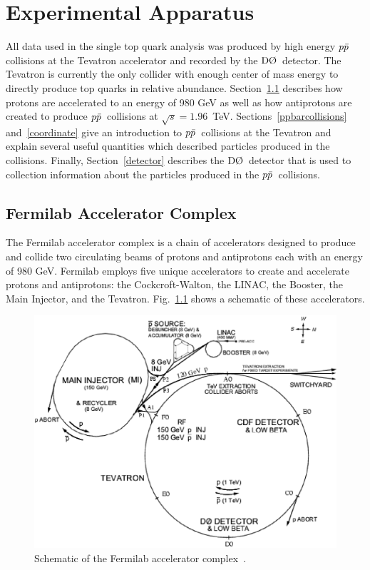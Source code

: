 \chapter{Experimental Apparatus}
\label{experiment}

All data used in the single top quark analysis was produced by high energy $\mbox{$p\bar{p}$}$ collisions at the Tevatron accelerator and recorded by the $\dzero$~detector. The Tevatron is currently the only collider with enough center of mass energy to directly produce top quarks in relative abundance. Section~\ref{tevatron} describes how protons are accelerated to an energy of 980 GeV as well as how antiprotons are created to produce $\mbox{$p\bar{p}$}$~collisions at $\sqrt{s}=1.96$~TeV. Sections~\ref{ppbarcollisions} and~\ref{coordinate} give an introduction to $\mbox{$p\bar{p}$}$~collisions at the Tevatron and explain several useful quantities which described particles produced in the collisions. Finally, Section~\ref{detector} describes the $\dzero$~detector that is used to collection information about the particles produced in the $\mbox{$p\bar{p}$}$~collisions. 

\section{Fermilab Accelerator Complex}
\label{tevatron}

The Fermilab accelerator complex is a chain of accelerators designed to produce and collide two circulating beams of protons and antiprotons each with an energy of 980 GeV. Fermilab employs five unique accelerators to create and accelerate protons and antiprotons: the Cockcroft-Walton, the LINAC, the Booster, the Main Injector, and the Tevatron. Fig.~\ref{FermilabAccelerator} shows a schematic of these accelerators.

\begin{figure}\centering
\includegraphics[width=6in,angle=0]{eps/Tevatron/Tevatron.eps}
\caption{Schematic of the Fermilab accelerator complex~\cite{Haas:2004rx}.}
\label{FermilabAccelerator}
\end{figure}

